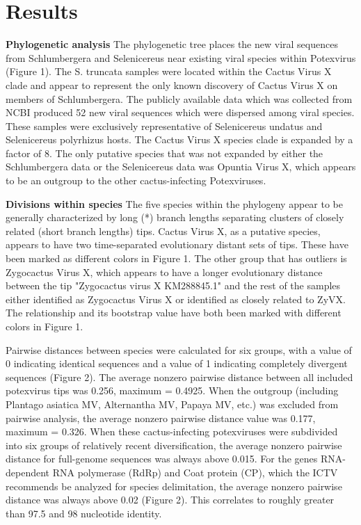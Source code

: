\documentclass{article}
\begin{document}
\section*{Results}
\textbf{Phylogenetic analysis}
The phylogenetic tree places the new viral sequences from Schlumbergera and Selenicereus near existing viral species within Potexvirus (Figure 1). 
The S. truncata samples were located within the Cactus Virus X clade and appear to represent the only known discovery of Cactus Virus X on members of Schlumbergera. 
The publicly available data which was collected from NCBI produced 52 new viral sequences which were dispersed among viral species. 
These samples were exclusively representative of Selenicereus undatus and Selenicereus polyrhizus hosts. 
The Cactus Virus X species clade is expanded by a factor of 8. 
The only putative species that was not expanded by either the Schlumbergera data or the Selenicereus data was Opuntia Virus X, which appears to be an outgroup to the other cactus-infecting Potexviruses. 

\textbf{Divisions within species}
The five species within the phylogeny appear to be generally characterized by long (*) branch lengths separating clusters of closely related (short branch lengths) tips. 
Cactus Virus X, as a putative species, appears to have two time-separated evolutionary distant sets of tips. 
These have been marked as different colors in Figure 1. 
The other group that has outliers is Zygocactus Virus X, which appears to have a longer evolutionary distance between the tip "Zygocactus virus X KM288845.1" and the rest of the samples either identified as Zygocactus Virus X or identified as closely related to ZyVX. 
The relationship and its bootstrap value have both been marked with different colors in Figure 1. 

Pairwise distances between species were calculated for six groups, with a value of 0 indicating identical sequences and a value of 1 indicating completely divergent sequences (Figure 2). 
The average nonzero pairwise distance between all included potexvirus tips was 0.256, maximum = 0.4925. 
When the outgroup (including Plantago asiatica MV, Alternantha MV, Papaya MV, etc.) was excluded from pairwise analysis, the average nonzero pairwise distance value was 0.177, maximum = 0.326. 
When these cactus-infecting potexviruses were subdivided into six groups of relatively recent diversification, the average nonzero pairwise distance for full-genome sequences was always above 0.015. 
For the genes RNA-dependent RNA polymerase (RdRp) and Coat protein (CP), which the ICTV recommends be analyzed for species delimitation, the average nonzero pairwise distance was always  above 0.02 (Figure 2). 
This correlates to roughly greater than 97.5 and 98 nucleotide identity. 
\end{document}
